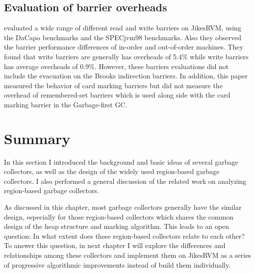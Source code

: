 \subsection{Evaluation of barrier overheads}

\cite{yang2012barriers} evaluated a wide range of different read and write barriers
on JikesRVM, using the DaCapo benchmarks and the SPECjvm98 benchmarks.
Also they observed the barrier performance differences of in-order and out-of-order machines.
They found that write barriers are generally has overheads of 5.4\% while write
barriers has average overheads of 0.9\%. However, these barriers evaluations did not
include the evacuation on the Brooks indirection barriers. In addition, this paper
measured the behavior of card marking barriers but did not measure the overhead of
remembered-set barriers which is used along side with the card marking barrier in
the Garbage-first GC.

\section{Summary}

In this section I introduced the background and basic ideas of several garbage collectors,
as well as the design of the widely used region-based garbage collectors.
I also performed a general discussion of the related work on analyzing region-based garbage collectors.

As discussed in this chapter, most garbage collectors generally have the similar design, especially for those
region-based collectors which shares the common design of the heap structure and
marking algorithm.
This leads to an open question: In what extent does these region-based collectors
relate to each other? To answer this question, in next chapter I will explore the
differences and relationships among these collectors and implement them on JikesRVM
as a series of progressive algorithmic improvements instead of build them individually.
